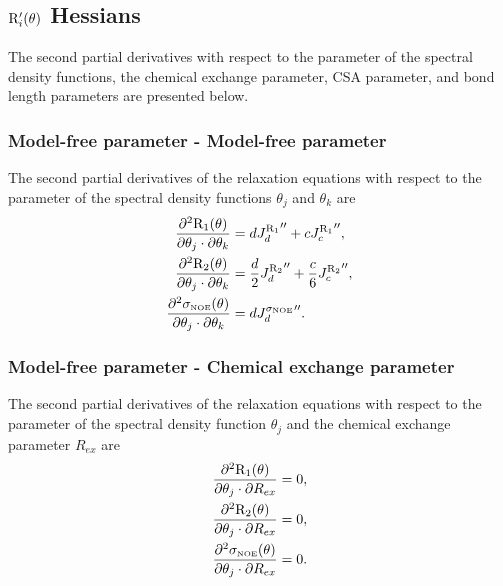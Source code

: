 
\subsection{$\mathrm{R}_i'(\theta)$ Hessians}

The second partial derivatives with respect to the parameter of the spectral density functions, the chemical exchange parameter, CSA parameter, and bond length parameters are presented below.


\subsubsection{Model-free parameter - Model-free parameter}

The second partial derivatives of the relaxation equations with respect to the parameter of the spectral density functions $\theta_j$ and $\theta_k$ are
\begin{align}
    \frac{\partial^2 \mathrm{R}_1(\theta)}{\partial \theta_j \cdot \partial \theta_k} &= d {J_d^{\mathrm{R}_1}}'' + c {J_c^{\mathrm{R}_1}}'',                      \label{eq: Ri': d2R1/dmfj.dmfk} \\
    \frac{\partial^2 \mathrm{R}_2(\theta)}{\partial \theta_j \cdot \partial \theta_k} &= \frac{d}{2} {J_d^{\mathrm{R}_2}}'' + \frac{c}{6} {J_c^{\mathrm{R}_2}}'',  \label{eq: Ri': d2R2/dmfj.dmfk} \\
    \frac{\partial^2 \sigma_{\scriptscriptstyle \mathrm{NOE}}(\theta)}{\partial \theta_j \cdot \partial \theta_k} &= d {J_d^{\sigma_{\scriptscriptstyle \mathrm{NOE}}}}''.                          \label{eq: Ri': d2sigmaNOE/dmfj.dmfk}
\end{align}


\subsubsection{Model-free parameter - Chemical exchange parameter}

The second partial derivatives of the relaxation equations with respect to the parameter of the spectral density function $\theta_j$ and the chemical exchange parameter $R_{ex}$ are
\begin{align}
    \frac{\partial^2 \mathrm{R}_1(\theta)}{\partial \theta_j \cdot \partial R_{ex}} &= 0,        \label{eq: Ri': d2R1/dmfj.dRex} \\
    \frac{\partial^2 \mathrm{R}_2(\theta)}{\partial \theta_j \cdot \partial R_{ex}} &= 0,        \label{eq: Ri': d2R2/dmfj.dRex} \\
    \frac{\partial^2 \sigma_{\scriptscriptstyle \mathrm{NOE}}(\theta)}{\partial \theta_j \cdot \partial R_{ex}} &= 0. \label{eq: Ri': d2sigmaNOE/dmfj.dRex}
\end{align}



